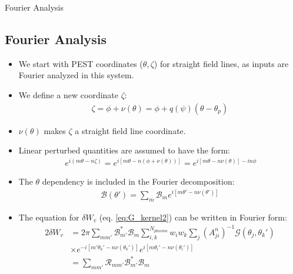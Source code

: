 \documentclass[8pt]{beamer}
\begin{document}
\begin{frame}{\color{white} Fourier Analysis}
\subsection{Fourier Analysis}
\begin{itemize}
    \item We start with PEST coordinates ($\theta, \zeta$) for straight field lines, as inputs are Fourier analyzed in this system.
    \item We define a new coordinate $\zeta$:
    \begin{align}
         \zeta = \phi + \nu(\theta) = \phi + q(\psi)(\theta-\theta_p)
    \end{align}
    \item $\nu(\theta)$ makes $\zeta$ a straight field line coordinate.
    \item Linear perturbed quantities are assumed to have the form:
    \begin{align}
         ~e^{i(m\theta - n \zeta)} = e^{i[m\theta-n(\phi+\nu(\theta))]} = e^{i[m\theta - n\nu(\theta)]-in\phi}
    \end{align}
    \item The $\theta$ dependency is included in the Fourier decomposition:
    \begin{align}
         \mathcal{B}(\theta') = \sum_m \mathcal{B}_m e^{i[m\theta'-n\nu(\theta')]}
    \end{align}
    \item The equation for $\delta W_v$ (eq. \ref{eq:G_kernel2}) can be written in Fourier form:
    \begin{align}
         2 \delta W_v &= 2\pi \sum_{mm'} \mathcal{B}_{m'}^* \mathcal{B}_m \sum_{i,k}^{N_{plasma}} w_i w_k \sum_j (A^n_{ji})^{-1} \mathcal{G}(\theta_j, \theta_k') \nonumber \\
         &\times e^{-i[m'\theta_k' - n\nu(\theta_k')]} e^{i[m\theta_i' - n\nu(\theta_i')]}\\
         &= \sum_{mm'} \mathcal{R}_{mm'} \mathcal{B}_{m'}^* \mathcal{B}_m \label{eq:deltaW_collocation}
    \end{align}
\end{itemize}
\end{frame}
\end{document}
